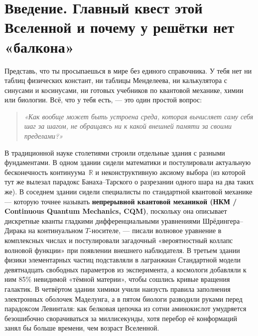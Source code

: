 
\chapter*{Введение. Главный квест этой Вселенной и почему у решётки нет «балкона»}

Представь, что ты просыпаешься в мире без единого справочника. У тебя нет ни таблиц физических констант, ни таблицы Менделеева, ни калькулятора с синусами и косинусами, ни готовых учебников по квантовой механике, химии или биологии. Всё, что у тебя есть, --- это один простой вопрос:

\begin{quote}
\itshape
«Как вообще может быть устроена среда, которая вычисляет саму себя шаг за шагом, не обращаясь ни к какой внешней памяти за своими пределами?»
\end{quote}

В традиционной науке столетиями строили отдельные здания с разными фундаментами. В одном здании сидели математики и постулировали актуальную бесконечность континуума~$\mathbb{R}$ и неконструктивную аксиому выбора (из которой тут же вылезал парадокс Банаха--Тарского о разрезании одного шара на два таких же). В соседнем здании сидели специалисты по стандартной квантовой механике --- которую точнее называть \textbf{непрерывной квантовой механикой (НКМ / Continuous Quantum Mechanics, CQM)}, поскольку она описывает дискретные кванты гладкими дифференциальными уравнениями Шрёдингера--Дирака на континуальном $T$-носителе, --- писали волновое уравнение в комплексных числах и постулировали загадочный «вероятностный коллапс волновой функции» при появлении внешнего наблюдателя. В третьем здании физики элементарных частиц подставляли в лагранжиан Стандартной модели девятнадцать свободных параметров из эксперимента, а космологи добавляли к ним 85\% невидимой «тёмной материи», чтобы сошлись кривые вращения галактик. В четвёртом здании химики учили наизусть правила заполнения электронных оболочек Маделунга, а в пятом биологи разводили руками перед парадоксом Левинталя: как белковая цепочка из сотни аминокислот умудряется безошибочно сворачиваться за миллисекунды, хотя перебор её конформаций занял бы больше времени, чем возраст Вселенной.


